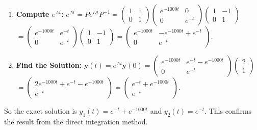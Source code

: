 \begin{solution}
\begin{enumerate}
    \item \textbf{Compute $e^{At}$:}
    $e^{At} = P e^{Dt} P^{-1} = \begin{pmatrix} 1 & 1 \\ 0 & 1 \end{pmatrix} \begin{pmatrix} e^{-1000t} & 0 \\ 0 & e^{-t} \end{pmatrix} \begin{pmatrix} 1 & -1 \\ 0 & 1 \end{pmatrix}$
    $= \begin{pmatrix} e^{-1000t} & e^{-t} \\ 0 & e^{-t} \end{pmatrix} \begin{pmatrix} 1 & -1 \\ 0 & 1 \end{pmatrix} = \begin{pmatrix} e^{-1000t} & -e^{-1000t} + e^{-t} \\ 0 & e^{-t} \end{pmatrix}$.
    \item \textbf{Find the Solution:} $\mathbf{y}(t) = e^{At} \mathbf{y}(0) = \begin{pmatrix} e^{-1000t} & e^{-t} - e^{-1000t} \\ 0 & e^{-t} \end{pmatrix} \begin{pmatrix} 2 \\ 1 \end{pmatrix}$
    $= \begin{pmatrix} 2e^{-1000t} + e^{-t} - e^{-1000t} \\ e^{-t} \end{pmatrix} = \begin{pmatrix} e^{-t} + e^{-1000t} \\ e^{-t} \end{pmatrix}$.
\end{enumerate}
So the exact solution is $y_1(t) = e^{-t} + e^{-1000t}$ and $y_2(t) = e^{-t}$. This confirms the result from the direct integration method.


\end{solution}
